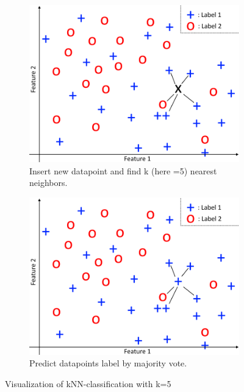 \begin{figure}[h]
	\centering
	\begin{subfigure}[t]{0.48\textwidth}
		\includegraphics[width=\textwidth]{images/knn1}
        \caption{Insert new datapoint and find k (here =5) nearest neighbors.}
	\end{subfigure}
	\quad
	\begin{subfigure}[t]{0.48\textwidth}
		\includegraphics[width=\textwidth]{images/knn2}
        \caption{Predict datapoints label by majority vote.}
	\end{subfigure}
	\caption{Visualization of kNN-classification with k=5}
	\label{fig:knn}
\end{figure}


